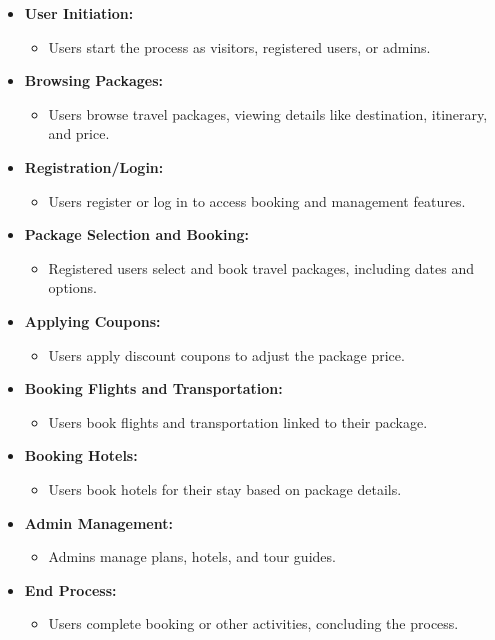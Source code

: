 \documentclass{scrreprt}
\begin{document}
\begin{itemize}
    \item \textbf{User Initiation:}
    \begin{itemize}
        \item Users start the process as visitors, registered users, or admins.
    \end{itemize}
    \item \textbf{Browsing Packages:}
    \begin{itemize}
        \item Users browse travel packages, viewing details like destination, itinerary, and price.
    \end{itemize}
    \item \textbf{Registration/Login:}
    \begin{itemize}
        \item Users register or log in to access booking and management features.
    \end{itemize}
    \item \textbf{Package Selection and Booking:}
    \begin{itemize}
        \item Registered users select and book travel packages, including dates and options.
    \end{itemize}
    \item \textbf{Applying Coupons:}
    \begin{itemize}
        \item Users apply discount coupons to adjust the package price.
    \end{itemize}
    \item \textbf{Booking Flights and Transportation:}
    \begin{itemize}
        \item Users book flights and transportation linked to their package.
    \end{itemize}
    \item \textbf{Booking Hotels:}
    \begin{itemize}
        \item Users book hotels for their stay based on package details.
    \end{itemize}
    \item \textbf{Admin Management:}
    \begin{itemize}
        \item Admins manage plans, hotels, and tour guides.
    \end{itemize}
    \item \textbf{End Process:}
    \begin{itemize}
        \item Users complete booking or other activities, concluding the process.
    \end{itemize}
\end{itemize}
\end{document}
